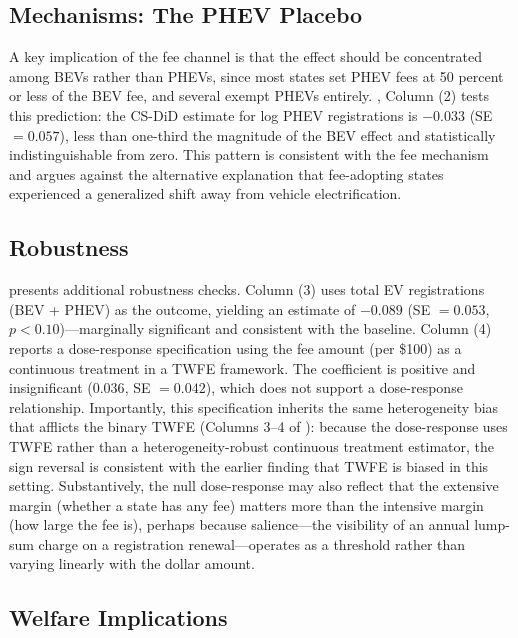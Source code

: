 \documentclass[12pt]{article}
\begin{document}
\subsection{Mechanisms: The PHEV Placebo}

A key implication of the fee channel is that the effect should be concentrated among BEVs rather than PHEVs, since most states set PHEV fees at 50 percent or less of the BEV fee, and several exempt PHEVs entirely. , Column (2) tests this prediction: the CS-DiD estimate for log PHEV registrations is $-0.033$ (SE $= 0.057$), less than one-third the magnitude of the BEV effect and statistically indistinguishable from zero. This pattern is consistent with the fee mechanism and argues against the alternative explanation that fee-adopting states experienced a generalized shift away from vehicle electrification.

\subsection{Robustness}



 presents additional robustness checks. Column (3) uses total EV registrations (BEV + PHEV) as the outcome, yielding an estimate of $-0.089$ (SE $= 0.053$, $p < 0.10$)---marginally significant and consistent with the baseline. Column (4) reports a dose-response specification using the fee amount (per \$100) as a continuous treatment in a TWFE framework. The coefficient is positive and insignificant ($0.036$, SE $= 0.042$), which does not support a dose-response relationship. Importantly, this specification inherits the same heterogeneity bias that afflicts the binary TWFE (Columns 3--4 of ): because the dose-response uses TWFE rather than a heterogeneity-robust continuous treatment estimator, the sign reversal is consistent with the earlier finding that TWFE is biased in this setting. Substantively, the null dose-response may also reflect that the extensive margin (whether a state has any fee) matters more than the intensive margin (how large the fee is), perhaps because salience---the visibility of an annual lump-sum charge on a registration renewal---operates as a threshold rather than varying linearly with the dollar amount.

\subsection{Welfare Implications}
\end{document}
